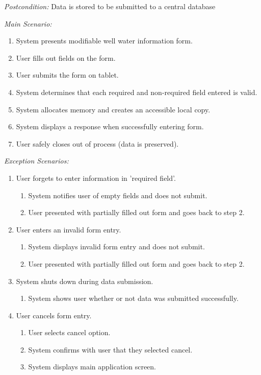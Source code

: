 \documentclass[twoside,letterpaper]{article}
\begin{document}
{\color{black} \textit{Postcondition:}  Data is stored to be submitted to a central database}
\newline

{\color{black} \textit{Main Scenario:}}
\begin{enumerate}
\item System presents modifiable well water information form.

\item User fills out fields on the form.

\item User submits the form on tablet.

\item System determines that each required and non-required field entered is valid.

\item System allocates memory and creates an accessible local copy.

\item System displays a response when successfully entering form.

\item User safely closes out of process (data is preserved).
\end{enumerate}

{\color{black} \textit{Exception Scenarios:}}
\begin{enumerate}
\item User forgets to enter information in 'required field'.
\begin{enumerate}
\item System notifies user of empty fields and does not submit.
\item User presented with partially filled out form and goes back to step 2.
\end{enumerate}

\item User enters an invalid form entry.
\begin{enumerate}
\item System displays invalid form entry and does not submit.
\item User presented with partially filled out form and goes back to step 2.
\end{enumerate}

\item System shuts down during data submission.
\begin{enumerate}
\item System shows user whether or not data was submitted successfully.
\end{enumerate}

\item User cancels form entry.
\begin{enumerate}
\item User selects cancel option.
\item System confirms with user that they selected cancel.
\item System displays main application screen.
\end{enumerate}
\end{enumerate}
\end{document}
